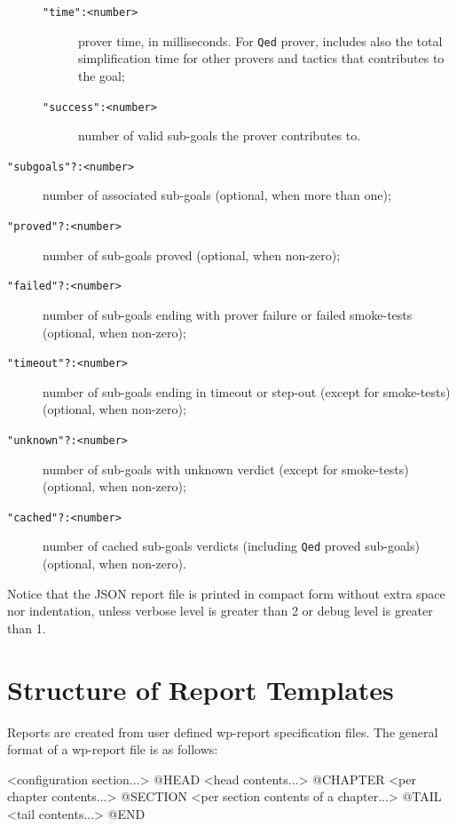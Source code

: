 \begin{description}
\begin{description}
  \item[\tt "time":<number>] prover time, in milliseconds. For \texttt{Qed}
    prover, includes also the total simplification time for other provers and
    tactics that contributes to the goal;
  \item[\tt "success":<number>] number of valid sub-goals the prover contributes to.
  \end{description}
\item[\tt "subgoals"?:<number>] number of associated sub-goals (optional, when more than one);
\item[\tt "proved"?:<number>] number of sub-goals proved (optional, when non-zero);
\item[\tt "failed"?:<number>] number of sub-goals ending with prover failure or failed smoke-tests
  (optional, when non-zero);
\item[\tt "timeout"?:<number>] number of sub-goals ending in timeout or step-out
  (except for smoke-tests) (optional, when non-zero);
\item[\tt "unknown"?:<number>] number of sub-goals with unknown verdict
  (except for smoke-tests) (optional, when non-zero);
\item[\tt "cached"?:<number>] number of cached sub-goals verdicts
  (including \texttt{Qed} proved sub-goals) (optional, when non-zero).
\end{description}

Notice that the JSON report file is printed in compact form without extra space nor indentation,
unless verbose level is greater than 2 or debug level is greater than 1.

\section{Structure of Report Templates}
\label{wp-template-reports}

Reports are created from user defined wp-report specification files.
The general format of a wp-report file is as follows:

\begin{logs}
  <configuration section...>
  @HEAD
  <head contents...>
  @CHAPTER
  <per chapter contents...>
  @SECTION
  <per section contents of a chapter...>
  @TAIL
  <tail contents...>
  @END
\end{logs}

